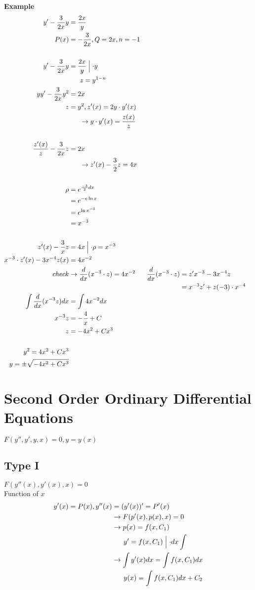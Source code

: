 \documentclass[10pt, letterpaper]{article}
\begin{document}
\textbf{Example}\\
\begin{align*}
y'-\frac{3}{2x}y &= \frac{2x}{y}\\
P(x) &= -\frac{3}{2x}, Q=2x, n=-1\\
\\
y'-\frac{3}{2x}y &= \frac{2x}{y} \Bigm \lvert \cdot y\\
&~~~~~ z=y^{1-n}\\
yy'-\frac{3}{2x}y^2 &= 2x\\
z &= y^2, z'(x)=2y \cdot y'(x)\\
&~~~~~ \rightarrow y \cdot y'(x) = \frac{z(x)}{z}\\
\\
\frac{z'(x)}{z} - \frac{3}{2x} z &= 2x\\
&~~~~~ \rightarrow z'(x) - \frac{3}{2} z = 4x\\
\\
\rho &= e^{\frac{-3}{2}dx}\\
&= e^{-e \ln x}\\
&= e^{\ln x^{-3}}\\
&= x^{-3}\\
\\
z'(x)-\frac{3}{x}z &= 4x \Bigm \lvert \cdot \rho = x^{-3}\\
x^{-3} \cdot z'(x) - 3x^{-4} z(x) &= 4x^{-2}\\
check &\rightarrow \frac{d}{dx} (x^{-3} \cdot z) =4x^{-2} & \frac{d}{dx}(x^{-3}\cdot z) &= z'x^{-3}-3x^{-4}z\\
& & &= x^{-3}z' + z(-3)\cdot x^{-4}\\
\int \limits \frac{d}{dx} (x^{-3}z) dx &= \int \limits 4x^{-2} dx\\
x^{-3}z &= -\frac{4}{x} + C\\
z &= -4x^2 + Cx^3\\
\\
y^2 = 4x^2+Cx^3\\
y=\pm\sqrt{-4x^2+Cx^3}
\end{align*}

\section{Second Order Ordinary Differential Equations}
$F(y'', y', y, x)=0, y=y(x)$\\
\subsection{Type I} $F(y''(x), y'(x), x)=0$\\
Function of $x$
\begin{align*}
y'(x)=P(x), y''(x) &= (y'(x))'=P'(x)\\
&\rightarrow F(p'(x), p(x), x) = 0\\
&\rightarrow p(x) = f(x, C_1)\\
&~~~~~ y'=f(x, C_1) \Bigm \lvert \cdot dx \int \limits\\
&\rightarrow \int \limits y'(x) dx = \int \limits f(x, C_1) dx\\
&~~~~~ y(x) = \int \limits f(x, C_1) dx +C_2
\end{align*}
\end{document}
